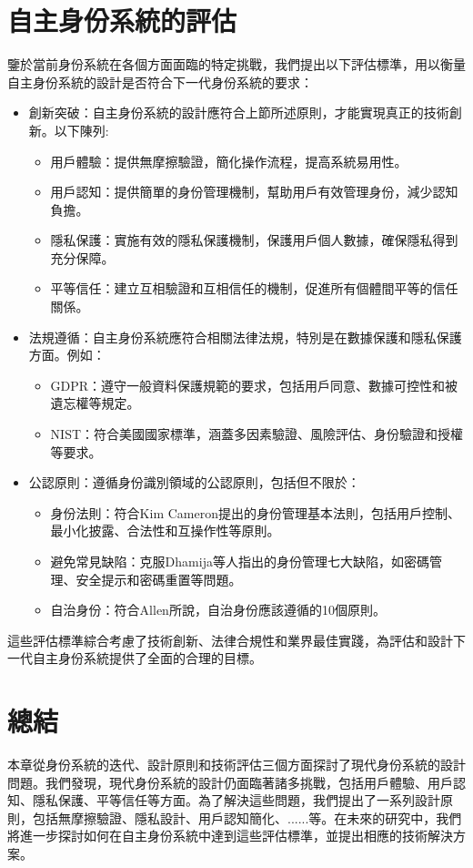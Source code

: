 \section{自主身份系統的評估}
鑒於當前身份系統在各個方面面臨的特定挑戰，我們提出以下評估標準，用以衡量自主身份系統的設計是否符合下一代身份系統的要求：
\begin{itemize}
  \item 創新突破：自主身份系統的設計應符合上節所述原則，才能實現真正的技術創新。以下陳列:
        \begin{itemize}
          \item 用戶體驗：提供無摩擦驗證，簡化操作流程，提高系統易用性。
          \item 用戶認知：提供簡單的身份管理機制，幫助用戶有效管理身份，減少認知負擔。
          \item 隱私保護：實施有效的隱私保護機制，保護用戶個人數據，確保隱私得到充分保障。
          \item 平等信任：建立互相驗證和互相信任的機制，促進所有個體間平等的信任關係。
        \end{itemize}
  \item 法規遵循：自主身份系統應符合相關法律法規，特別是在數據保護和隱私保護方面。例如：
        \begin{itemize}
          \item GDPR：遵守一般資料保護規範\cite{GDPR2016}的要求，包括用戶同意、數據可控性和被遺忘權等規定。
          \item NIST：符合美國國家標準\cite{NIST800-63-3}，涵蓋多因素驗證、風險評估、身份驗證和授權等要求。
        \end{itemize}
  \item 公認原則：遵循身份識別領域的公認原則，包括但不限於：
        \begin{itemize}
          \item 身份法則：符合Kim Cameron提出的身份管理基本法則\cite{cameron2005laws}，包括用戶控制、最小化披露、合法性和互操作性等原則。
          \item 避免常見缺陷：克服Dhamija等人\cite{dhamija2008sevenflaws}指出的身份管理七大缺陷，如密碼管理、安全提示和密碼重置等問題。
          \item 自治身份：符合Allen\cite{allen2016selfsovereign}所說，自治身份應該遵循的10個原則。
        \end{itemize}
\end{itemize}
這些評估標準綜合考慮了技術創新、法律合規性和業界最佳實踐，為評估和設計下一代自主身份系統提供了全面的合理的目標。
\section{總結}
本章從身份系統的迭代、設計原則和技術評估三個方面探討了現代身份系統的設計問題。我們發現，現代身份系統的設計仍面臨著諸多挑戰，包括用戶體驗、用戶認知、隱私保護、平等信任等方面。為了解決這些問題，我們提出了一系列設計原則，包括無摩擦驗證、隱私設計、用戶認知簡化、......等。在未來的研究中，我們將進一步探討如何在自主身份系統中達到這些評估標準，並提出相應的技術解決方案。